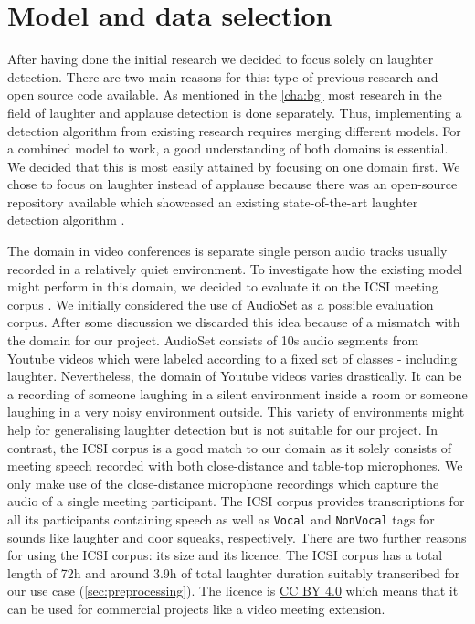 \documentclass[bsc,frontabs,parskip,deptreport]{infthesis}
\begin{document}
\section{Model and data selection}\label{sec:model-and-data}
After having done the initial research we decided to focus solely on laughter detection. 
There are two main reasons for this: type of previous research and open source code available.  
As mentioned in the \autoref{cha:bg} most research in the field of laughter and applause detection is done separately. 
Thus, implementing a detection algorithm from existing research requires merging different models. 
For a combined model to work, a good understanding of both domains is essential.
We decided that this is most easily attained by focusing on one domain first. 
We chose to focus on laughter instead of applause because there was an open-source repository available which showcased an existing state-of-the-art laughter detection algorithm \citep{gillick-codebase}.

The domain in video conferences is separate single person audio tracks usually recorded in a relatively quiet environment.
To investigate how the existing model might perform in this domain, we decided to evaluate it on the ICSI meeting corpus \citep{morgan2001meeting}. 
We initially considered the use of AudioSet \citep{googleaudioset} as a possible evaluation corpus. After some discussion we discarded this idea because of a mismatch with the domain for our project. AudioSet  consists of 10s audio segments from Youtube videos which were labeled according to a fixed set of classes - including laughter. Nevertheless, the domain of Youtube videos varies drastically. It can be a recording of someone laughing in a silent environment inside a room or someone laughing in a very noisy environment outside. This variety of environments might help for generalising laughter detection but is not suitable for our project.
In contrast, the ICSI corpus is a good match to our domain as it solely consists of meeting speech recorded with both close-distance and table-top microphones. 
We only make use of the close-distance microphone recordings which capture the audio of a single meeting participant.
The ICSI corpus provides transcriptions for all its participants containing speech as well as \texttt{Vocal} and \texttt{NonVocal} tags for sounds like laughter and door squeaks, respectively.
There are two further reasons for using the ICSI corpus: its size and its licence.
The ICSI corpus has a total length of 72h and around 3.9h of total laughter duration suitably transcribed for our use case (\autoref{sec:preprocessing}).
The licence is \href{https://creativecommons.org/licenses/by/4.0/legalcode}{CC BY 4.0} which means that it can be used for commercial projects like a video meeting extension.
\end{document}
